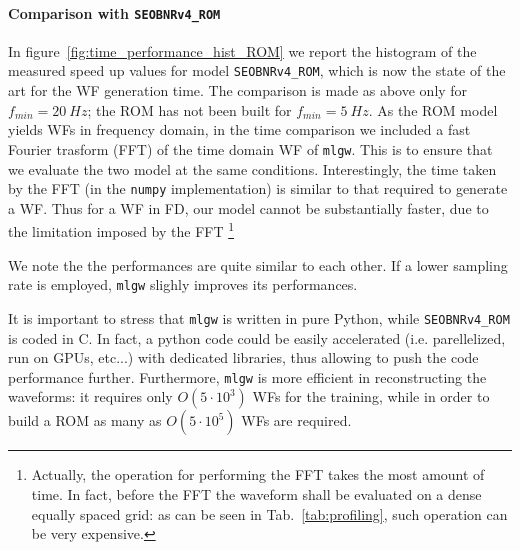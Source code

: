 \paragraph{Comparison with \texttt{SEOBNRv4\_ROM}}
In figure~\ref{fig:time_performance_hist_ROM} we report the histogram of the measured speed up values for model \texttt{SEOBNRv4\_ROM}, which is now the state of the art for the WF generation time.
The comparison is made as above only for $f_{min} = \SI{20}{Hz}$; the ROM has not been built for $f_{min} = \SI{5}{Hz}$.
As the ROM model yields WFs in frequency domain, in the time comparison we included a fast Fourier trasform (FFT) of the time domain WF of \texttt{mlgw}. This is to ensure that we evaluate the two model at the same conditions.
Interestingly, the time taken by the FFT (in the \texttt{numpy}
implementation) is similar to that required to generate a WF. Thus for
a WF in FD, our model cannot be substantially faster, due to the
limitation imposed by the FFT
\footnote{Actually, the operation for performing the FFT takes the most amount of time. In fact, before the FFT the waveform shall be evaluated on a dense equally spaced grid: as can be seen in Tab.~\ref{tab:profiling}, such operation can be very expensive.}
\par
We note the the performances are quite similar to each other.
If a lower sampling rate is employed, \texttt{mlgw} slighly improves its performances.
\par
It is important to stress that \texttt{mlgw} is written in pure
Python, while \texttt{SEOBNRv4\_ROM} is coded in C.
In fact, a python code could be easily accelerated (i.e. parellelized, run on GPUs, etc...) with dedicated libraries, thus allowing to push the code performance further.
%
Furthermore, \texttt{mlgw} is more efficient in reconstructing the
waveforms: it requires only $O(5\cdot 10^3)$ WFs for the training,
while in order to build a ROM as many as $O(5\cdot 10^5)$ WFs are
required. 
\par
